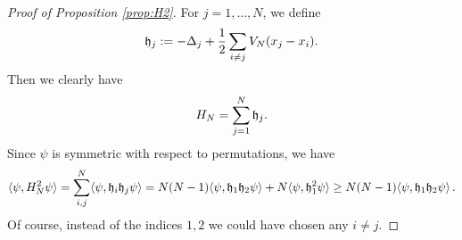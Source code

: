 \documentclass[11pt]{article}
\newcommand{\fh}{{\frak h}}
\begin{document}
\begin{proof}[Proof of Proposition \ref{prop:H2}]
For $j=1,\dots ,N$, we define \begin{equation}\label{eq:frakh}
 \fh_j
:= -\Delta_j + \frac{1}{2} \sum_{i \neq j} V_N (x_j -x_i)
.\end{equation} Then we clearly have
\[ H_N = \sum_{j=1}^N \fh_j . \]
Since $\psi$ is symmetric with respect to permutations, we have
\begin{equation}\label{eq:H2-1} \langle \psi, H_N^2 \psi \rangle = \sum_{i,j}^N \langle \psi,
\fh_i \fh_j \psi \rangle = N(N-1) \langle \psi, \fh_1 \fh_2 \psi
\rangle + N \langle \psi, \fh_1^2 \psi \rangle \geq N (N-1) \langle
\psi, \fh_1 \fh_2 \psi \rangle \, .\end{equation} Of course, instead
of the indices $1,2$ we could have chosen any $i \neq j$.

\medskip


\end{proof}
\end{document}
